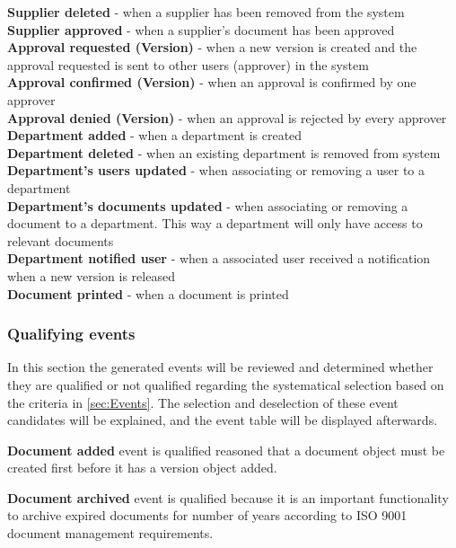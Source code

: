 \textbf{Supplier deleted} - when a supplier has been removed from the system\\
\textbf{Supplier approved} - when a supplier's document has been approved\\
\textbf{Approval requested (Version)} - when a new version is created and the approval requested is sent to other users (approver) in the system\\
\textbf{Approval confirmed (Version)} - when an approval is confirmed by one approver\\
\textbf{Approval denied (Version)} - when an approval is rejected by every approver\\
\textbf{Department added} - when a department is created\\
\textbf{Department deleted} - when an existing department is removed from system\\
\textbf{Department's users updated} - when associating or removing a user to a department\\
\textbf{Department's documents updated} - when associating or removing a document to a department. This way a department will only have access to relevant documents\\
\textbf{Department notified user} - when a associated user received a notification when a new version is released\\ 
\textbf{Document printed} - when a document is printed\\


\subsubsection{Qualifying events}
In this section the generated events will be reviewed and determined whether they are qualified or not qualified regarding the systematical selection based on the criteria in \cref{sec:Events}.
The selection and deselection of these event candidates will be explained, and the event table will be displayed afterwards.

\textbf{Document added} event is qualified reasoned that a document object must be created first before it has a version object added. 

\textbf{Document archived} event is qualified because it is an important functionality to archive expired documents for number of years according to ISO 9001 document management requirements. 

